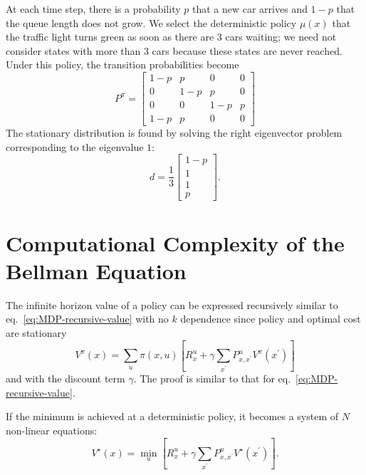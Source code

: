 At each time step, there is a probability $p$ that a new car arrives and $1-p$ that the queue length does not grow. We select the deterministic policy $\mu(x)$ that the traffic light turns green as soon as there are 3 cars waiting; we need not consider states with more than 3 cars because these states are never reached. Under this policy, the transition probabilities become
\begin{equation*}
  P^\pi =
  \begin{bmatrix}
    1-p & p & 0 & 0 \\
    0 & 1-p & p & 0 \\
    0 & 0 & 1-p & p \\
    1-p & p & 0 & 0
  \end{bmatrix}
\end{equation*}
The stationary distribution is found by solving the right eigenvector problem corresponding to the eigenvalue $1$:
\begin{equation*}
  d =
  \frac{1}{3}\begin{bmatrix}
               1-p \\ 1 \\ 1 \\ p
  \end{bmatrix}.
\end{equation*}

\section{Computational Complexity of the Bellman Equation}
\label{sec:MDP-computation-complexity-bellman-eq}

The infinite horizon value of a policy can be expressed recursively similar to eq.~\eqref{eq:MDP-recursive-value} with no $k$ dependence since policy and optimal cost are stationary
\begin{equation}
  \label{eq:MDP-recursive-value-infinite-horizon}
  V^\pi(x) = \sum_u \pi(x,u)\left[R^u_x + \gamma \sum_{x^\prime}P^u_{x,x^\prime} V^\pi(x^\prime)\right]
\end{equation}
and with the discount term $\gamma$. The proof is similar to that for eq.~\eqref{eq:MDP-recursive-value}.

If the minimum is achieved at a deterministic policy, it becomes a system of $N$ non-linear equations:
\begin{equation*}
  V^\star(x) = \min_u \left[R^u_x + \gamma \sum_{x^\prime}P^u_{x,x^\prime} V^\star(x^\prime)\right].
\end{equation*}

